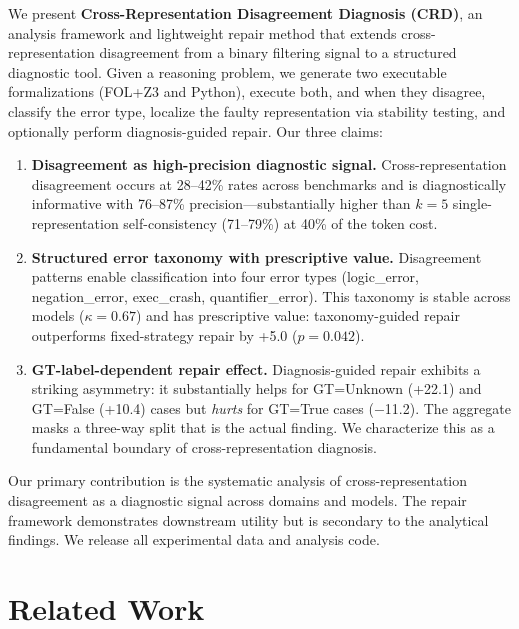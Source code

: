 \documentclass[11pt,a4paper]{article}
\newcommand{\method}{CRD}
\newcommand{\pp}{\text{pp}}
\begin{document}
We present \textbf{Cross-Representation Disagreement Diagnosis (\method{})}, an analysis framework and lightweight repair method that extends cross-representation disagreement from a binary filtering signal to a structured diagnostic tool. Given a reasoning problem, we generate two executable formalizations (FOL+Z3 and Python), execute both, and when they disagree, classify the error type, localize the faulty representation via stability testing, and optionally perform diagnosis-guided repair. Our three claims:

\begin{enumerate}
\item \textbf{Disagreement as high-precision diagnostic signal.} Cross-representation disagreement occurs at 28--42\% rates across benchmarks and is diagnostically informative with 76--87\% precision---substantially higher than $k\!=\!5$ single-representation self-consistency (71--79\%) at 40\% of the token cost.

\item \textbf{Structured error taxonomy with prescriptive value.} Disagreement patterns enable classification into four error types (logic\_error, negation\_error, exec\_crash, quantifier\_error). This taxonomy is stable across models ($\kappa\!=\!0.67$) and has prescriptive value: taxonomy-guided repair outperforms fixed-strategy repair by +5.0\pp{} ($p\!=\!0.042$).

\item \textbf{GT-label-dependent repair effect.} Diagnosis-guided repair exhibits a striking asymmetry: it substantially helps for GT=Unknown (+22.1\pp{}) and GT=False (+10.4\pp{}) cases but \emph{hurts} for GT=True cases ($-$11.2\pp{}). The aggregate masks a three-way split that is the actual finding. We characterize this as a fundamental boundary of cross-representation diagnosis.
\end{enumerate}

Our primary contribution is the systematic analysis of cross-representation disagreement as a diagnostic signal across domains and models. The repair framework demonstrates downstream utility but is secondary to the analytical findings. We release all experimental data and analysis code.

\section{Related Work}
\end{document}
